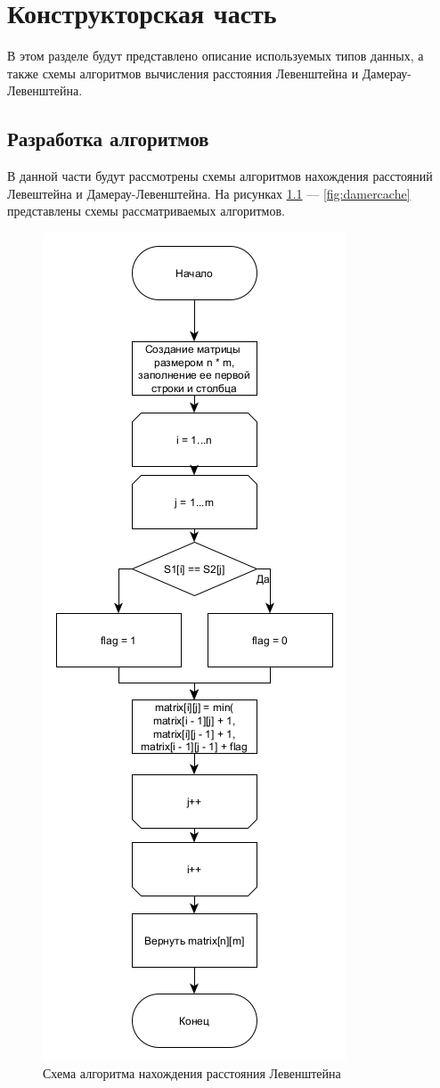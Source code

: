 
\chapter{Конструкторская часть}
В этом разделе будут представлено описание используемых типов данных, а также схемы алгоритмов вычисления расстояния Левенштейна и Дамерау-Левенштейна.

\section{Разработка алгоритмов}
В данной части будут рассмотрены схемы алгоритмов нахождения расстояний Левештейна и Дамерау-Левенштейна. На рисунках \ref{fig:leven} --- \ref{fig:damercache} представлены схемы рассматриваемых алгоритмов.
\begin{figure}[h]
	\centering
	\includegraphics[scale = 0.7]{img/levenshtein.png}
	\caption{Схема алгоритма нахождения расстояния Левенштейна}
	\label{fig:leven}
\end{figure}
